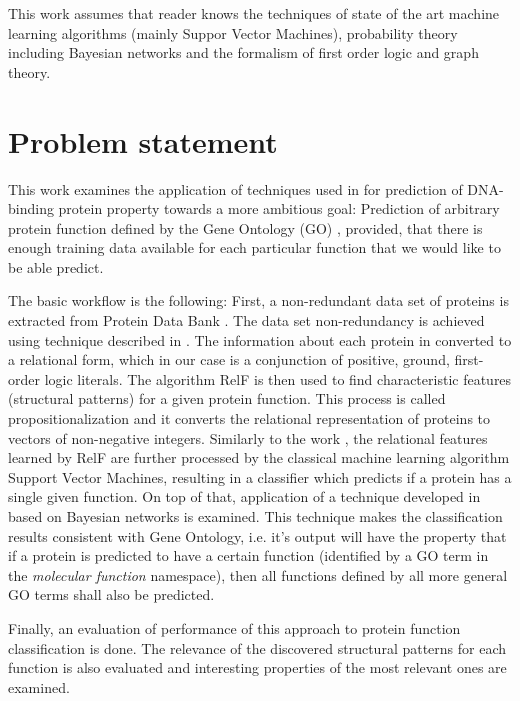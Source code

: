 \documentclass[11pt,twoside,a4paper]{book}
\begin{document}
This work assumes that reader knows
the techniques of state of the art machine learning algorithms (mainly Suppor Vector Machines),
probability theory including Bayesian networks
and the formalism of first order logic and graph theory.

\section{Problem statement}

This work examines the application of techniques used in \cite{szabova}
for prediction of DNA-binding protein property towards a more ambitious goal:
Prediction of arbitrary protein function
defined by the Gene Ontology (GO) \cite{go}\cite{gores},
provided, that there is enough training data available
for each particular function that we would like to be able predict.

The basic workflow is the following:
First, a non-redundant data set of proteins is extracted from Protein Data Bank \cite{pdb}.
The data set non-redundancy is achieved using technique described in \cite{maxind}.
The information about each protein in converted to a relational form, 
which in our case is a conjunction of positive, ground, first-order logic literals.
The algorithm RelF \cite{relf} is then used to find characteristic features (structural patterns)
for a given protein function.
This process is called propositionalization and it converts the 
relational representation of proteins to vectors of non-negative integers.
Similarly to the work \cite{szabova}, the relational features learned by RelF are further
processed by the classical machine learning algorithm Support Vector Machines,
resulting in a classifier which predicts if a protein has a single given function.
On top of that,
application of a technique developed in \cite{bnet} based on Bayesian networks is examined.
This technique makes the classification
results consistent with Gene Ontology,
i.e. it's output will have the property that
if a protein is predicted to have a certain function
(identified by a GO term in the \emph{molecular function} namespace),
then all functions defined by all more general GO terms shall also be predicted.

Finally, an evaluation of performance of this approach to protein function classification is done. 
The relevance of the discovered structural patterns for each function is also evaluated  
and interesting properties of the most relevant ones are examined.

\end{document}
